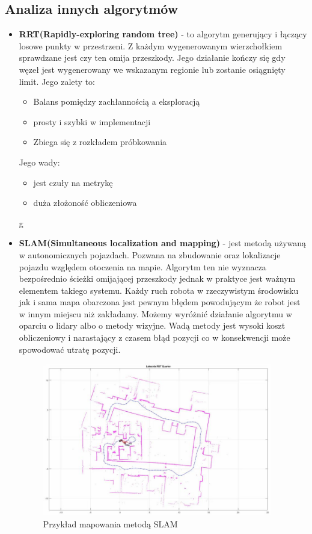 \subsection{Analiza innych algorytmów}
\begin{itemize}
	\item{ \textbf{RRT(Rapidly-exploring random tree)}\cite{RRTLec} - to algorytm generujący i łączący 
	losowe punkty w przestrzeni. Z każdym wygenerowanym wierzchołkiem sprawdzane jest czy ten omija przeszkody.
	Jego działanie kończy się gdy węzeł jest wygenerowany we wskazanym regionie lub zostanie osiągnięty limit.
	Jego zalety to:
		\begin{itemize}
			\item Balans pomiędzy zachłannością a eksploracją
			\item prosty i szybki w implementacji
			\item Zbiega się z rozkładem próbkowania
		\end{itemize}
	Jego wady:
		\begin{itemize}
			\item jest czuły na metrykę
			\item duża złożoność obliczeniowa
		\end{itemize}
	}g
	\item{\textbf{SLAM(Simultaneous localization and mapping)} \cite{SLAMMat} - jest metodą używaną w autonomicznych 
	pojazdach. Pozwana na zbudowanie oraz lokalizacje pojazdu względem otoczenia na mapie. Algorytm ten nie wyznacza bezpośrednio
	ścieżki omijającej przeszkody jednak w praktyce jest ważnym elementem takiego systemu. Każdy ruch robota w rzeczywistym 
	środowisku jak i sama mapa obarczona jest pewnym błędem powodującym że robot jest w innym miejscu niż zakładamy. 
	Możemy wyróżnić działanie algorytmu w oparciu o lidary albo o metody wizyjne. Wadą metody jest wysoki koszt obliczeniowy 
	i narastający z czasem błąd pozycji co w konsekwencji może spowodować utratę pozycji.
	\begin{figure}[H]
		\centering
		\includegraphics[width=10cm]{pages/algorytm/zdjecia/slam.jpg}
		\caption{Przykład mapowania metodą SLAM\cite{SLAMMat}}
		\label{fig:Rys}
	\end{figure}
	}
\end{itemize}
